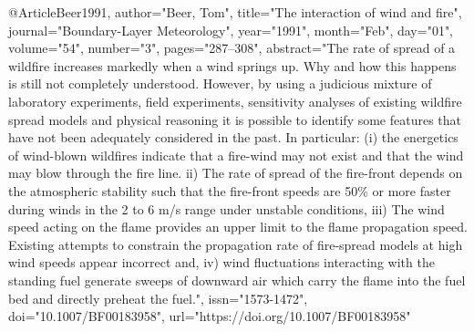 @Article{Beer1991,
author="Beer, Tom",
title="The interaction of wind and fire",
journal="Boundary-Layer Meteorology",
year="1991",
month="Feb",
day="01",
volume="54",
number="3",
pages="287--308",
abstract="The rate of spread of a wildfire increases markedly when a wind springs up. Why and how this happens is still not completely understood. However, by using a judicious mixture of laboratory experiments, field experiments, sensitivity analyses of existing wildfire spread models and physical reasoning it is possible to identify some features that have not been adequately considered in the past. In particular: (i) the energetics of wind-blown wildfires indicate that a fire-wind may not exist and that the wind may blow through the fire line. ii) The rate of spread of the fire-front depends on the atmospheric stability such that the fire-front speeds are 50{\%} or more faster during winds in the 2 to 6 m/s range under unstable conditions, iii) The wind speed acting on the flame provides an upper limit to the flame propagation speed. Existing attempts to constrain the propagation rate of fire-spread models at high wind speeds appear incorrect and, iv) wind fluctuations interacting with the standing fuel generate sweeps of downward air which carry the flame into the fuel bed and directly preheat the fuel.",
issn="1573-1472",
doi="10.1007/BF00183958",
url="https://doi.org/10.1007/BF00183958"
}

